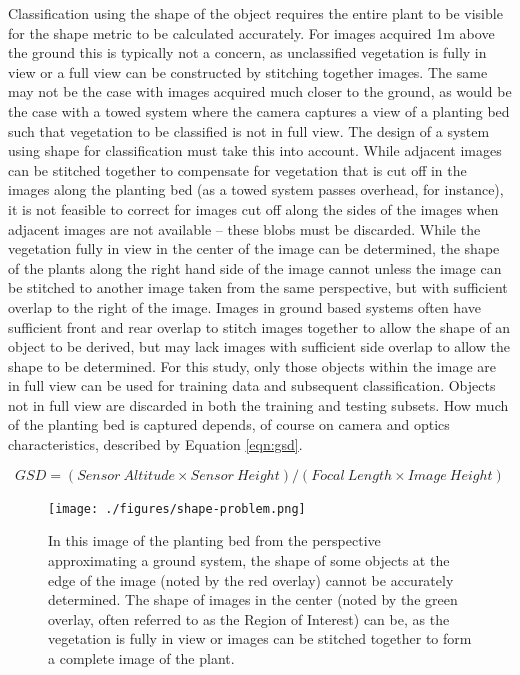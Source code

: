 \documentclass[letterpaper, notitlepage]{report}
\begin{document}
Classification using the shape of the object requires  the entire plant to be visible for the shape metric to be calculated accurately. For images acquired 1m above the ground this is typically not a concern, as unclassified vegetation is fully in view or a full view can be constructed by stitching together images. The same may not be the case with images acquired much closer to the ground, as would be the case with a towed system where the camera captures a view of a planting bed such that vegetation to be classified is not in full view. The design of a system using shape for classification must take this into account. While adjacent images can be stitched together to compensate for vegetation that is cut off in the images along the planting bed (as a towed system passes overhead, for instance), it is not feasible to correct for images cut off along the sides of the images when adjacent images are not available -- these blobs must be discarded. While the vegetation fully in view in the center of the image can be determined, the shape of the plants along the right hand side of the image cannot unless the image can be stitched to another image taken from the same perspective, but with sufficient overlap to the right of the image. Images in ground based systems often have sufficient front and rear overlap to stitch images together to allow the shape of an object to be derived, but may lack images with sufficient side overlap to allow the shape to be determined. For this study, only those objects within the image are in full view can be used for training data and subsequent classification. Objects not in full view are discarded in both the training and testing subsets. How much of the planting bed is captured depends, of course on camera and 
optics characteristics, described by Equation \ref{eqn:gsd}.

\begin{equation}
\label{eqn:gsd}
GSD = (Sensor\ Altitude \times Sensor\ Height) / (Focal\ Length \times Image\ Height)
\end{equation}

 \begin{figure}[H]
	\centering
	\texttt{[image: ./figures/shape-problem.png]}
	\caption[Shape of some objects cannot be determined]{In this image of the planting bed from the perspective approximating a ground system, the shape of some objects at the edge of the image (noted by the red overlay) cannot be accurately determined. The shape of images in the center (noted by the green overlay, often referred to as the Region of Interest) can be, as the vegetation is fully in view or images can be stitched together to form a complete image of the plant.}
	\label{fig:shape-problem}
\end{figure}
\end{document}
